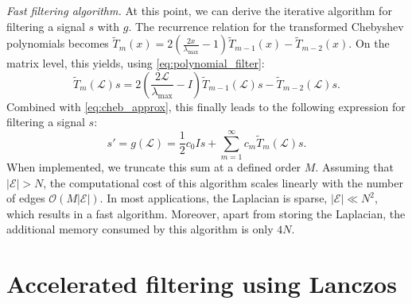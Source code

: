 \documentclass{article}
\newcommand{\E}{\mathcal{E}}
\newcommand{\Lap}{\mathcal{L}}
\newcommand{\Om}{\mathcal{O}}
\begin{document}
\textit{Fast filtering algorithm. }
At this point, we can derive the iterative algorithm for filtering a signal $s$ with $g$. The recurrence relation for the transformed Chebyshev polynomials becomes 
$\tilde{T}_m(x)
= 2\left( \frac{2x}{\lambda_{\max}}-1 \right) \tilde{T}_{m-1}(x)
- \tilde{T}_{m-2}(x)$. On the matrix level, this yields, using \eqref{eq:polynomial_filter}:
\begin{equation*}
\tilde{T}_m(\Lap) s=  2\left( \frac{2\Lap}{\lambda_{\max}}-I \right) \tilde{T}_{m-1}(\Lap)s
- \tilde{T}_{m-2}(\Lap)s.
\end{equation*}
Combined with \eqref{eq:cheb_approx}, this finally leads to the following expression for filtering a signal $s$:
\begin{equation*}
s' = g(\Lap) = \frac{1}{2} c_0 I s + \sum_{m=1}^\infty c_m \tilde{T}_m(\Lap)s.
\end{equation*}
When implemented, we truncate this sum at a defined order $M$. Assuming that $|\E|>N$, the computational cost of this algorithm scales linearly with the number of edges $\Om(M|\E|)$. In most applications, the Laplacian is sparse,
$|\E|\ll N^2$, which results in a fast algorithm. Moreover, apart from storing the Laplacian, the additional memory consumed by this algorithm is only $4 N$.

\section{Accelerated filtering using Lanczos} \label{sec:lanczos}
\end{document}
